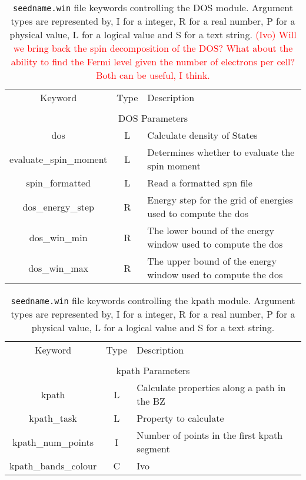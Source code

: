 \begin{table}[hH!]
\begin{center}
\begin{tabular}{|c|c|p{6cm}|}
\hline
Keyword & Type & Description \\
        &      &             \\
\hline\hline
\multicolumn{3}{|c|}{DOS Parameters} \\
\hline
{\sc dos}  & L & Calculate density of States \\
{\sc evaluate\_spin\_moment}& L & Determines whether to evaluate the spin moment\\
{\sc spin\_formatted}& L & Read a formatted spn file\\
{\sc dos\_energy\_step}& R & Energy step for the grid of energies
used to compute the dos\\
{\sc dos\_win\_min} & R & The lower bound of the energy window used
to compute the dos\\
{\sc dos\_win\_max}& R & The upper bound of the energy window used
to compute the dos\\
\hline
\end{tabular}
\caption[Parameter file keywords controlling the DOS module.]
{{\tt seedname.win} file keywords controlling the DOS module. Argument types
are represented by, I for a integer, R for a real number, P for a
physical value, L for a logical value and S for a text string.
\textcolor{red}{(Ivo) Will we bring back the spin decomposition of the DOS?
What about the ability to find the Fermi level given the number of
electrons per cell? Both can be useful, I think.}
}
\label{parameter_keywords_dos}
\end{center}
\end{table}


\begin{table}[hH!]
\begin{center}
\begin{tabular}{|c|c|p{6cm}|}
\hline
Keyword & Type & Description \\
        &      &             \\
\hline\hline
\multicolumn{3}{|c|}{kpath Parameters} \\
\hline
{\sc kpath}  & L & Calculate properties along a path in the BZ \\
{\sc kpath\_task}& L & Property to calculate\\
{\sc kpath\_num\_points}& I & Number of points in the first kpath segment\\
{\sc kpath\_bands\_colour}& C & Ivo\\
\hline
\end{tabular}
\caption[Parameter file keywords controlling the kpath module.]
{{\tt seedname.win} file keywords controlling the kpath module. Argument types
are represented by, I for a integer, R for a real number, P for a
physical value, L for a logical value and S for a text string.}
\label{parameter_keywords_kpath}
\end{center}
\end{table}

